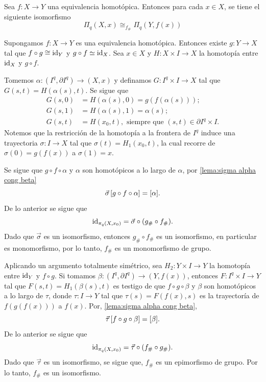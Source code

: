 \begin{prop}
Sea $f:X\to Y$ una equivalencia homotópica. Entonces para cada $x\in X$, se tiene el siguiente isomorfismo
\begin{equation*}
    \Pi_q(X,x)\cong_{f_\#} \Pi_q(Y,f(x))
\end{equation*}
\end{prop}
\begin{dem}
    Supongamos $f:X\to Y$ es una equivalencia homotópica. Entonces existe $g:Y\to X$ tal que $f\circ g\cong \mathrm{id}_Y$ y $g\circ f\simeq \mathrm{id}_X$. Sea $x\in X$ y $H:X\times I\to X$ la homotopía entre $\mathrm{id}_X$ y $g\circ f$.
    
    Tomemos $\alpha:(I^q,\partial I^q)\to(X,x)$ y definamos $G:I^q\times I\to X$ tal que $G(s,t)=H(\alpha(s),t)$. Se sigue que
    \begin{align*}
        G(s,0)&=H(\alpha(s),0)=g(f(\alpha(s)));\\
        G(s,1)&=H(\alpha(s),1)=\alpha(s);\\
        G(s,t)&=H(x_0,t), \text{ siempre que } (s,t)\in\partial I^q\times I.
    \end{align*}
    Notemos que la restricción de la homotopía a la frontera de $I^q$ induce una trayectoria $\sigma:I\to X$ tal que $\sigma(t)=H_1(x_0,t)$, la cual recorre de $\sigma(0)=g(f(x))$ a $\sigma(1)=x$. 
    
    Se sigue que $g\circ f\circ \alpha$ y $\alpha$ son homotópicos a lo largo de $\alpha$, por \ref{lema:sigma alpha cong beta}
    \[
        \vec{\sigma}\hspace{0.5mm}[g\circ f\circ \alpha]=[\alpha].
    \]
    De lo anterior se sigue que
    \[
        \mathrm{id}_{\pi_q(X,x_0)} = \vec{\sigma}\circ (g_\#\circ f_\#).
    \]
    Dado que $\vec{\sigma}$ es un isomorfismo, entonces $g_\#\circ f_\#$ es un isomorfismo, en particular es monomorfismo, por lo tanto, $f_\#$ es un monomorfismo de grupo.
    
    Aplicando un argumento totalmente simétrico, sea $H_2:Y\times I\to Y$ la homotopía entre $\mathrm{id}_Y$ y $f\circ g$. Si tomamos $\beta:(I^q,\partial I^q)\to (Y,f(x))$, entonces $F:I^q\times I\to Y$ tal que $F(s,t)=H_1(\beta(s),t)$ es testigo de que  $f\circ g\circ \beta$ y $\beta$ son homotópicos a lo largo de $\tau$, donde $\tau:I\to Y$ tal que $\tau(s)=F(f(x),s)$ es la trayectoría de $f(g(f(x)))$ a $f(x)$. Por, \ref{lema:sigma alpha cong beta}, 
     \[
        \vec{\tau}\hspace{0.55mm}[f\circ g\circ \beta]=[\beta].
    \]
    De lo anterior se sigue que
    \[
        \mathrm{id}_{\pi_q(X,x_0)} =\vec{\tau}\circ (f_\#\circ g_\#).
    \]
    Dado que $\vec{\tau}$ es un isomorfismo, se sigue que, $f_{\#}$ es un epimorfismo de grupo. Por lo tanto, $f_{\#}$ es un isomorfismo.
\end{dem}

